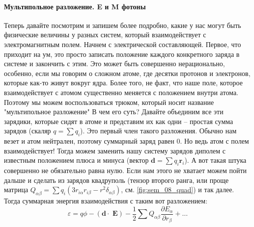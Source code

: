 \documentclass[12pt]{article}
\begin{document}
\paragraph{Мультипольное разложение. E и M фотоны}
Теперь давайте посмотрим и запишем более подробно, какие у нас могут быть физические величины у разных систем, который взаимодействует с электромагнитным полем. Начнем с электрической составляющей. Первое, что приходит на ум, это просто записать положение каждого конкретного заряда в системе и закончить с этим. Это может быть совершенно нерационально, особенно, если мы говорим о сложном атоме, где десятки протонов и электронов, которые как-то живут вокруг ядра. Более того, не факт, что наше поле, которое взаимодействует с атомом существенно меняется с положением внутри атома. Поэтому мы можем воспользоваться трюком, который носит название "мультипольное разложение" В чем его суть? Давайте объединим все эти зарядики, которые сидят в атоме и представим их как одни -- простая сумма зарядов (скаляр $q = \sum q_i$). Это первый член такого разложения. Обычно нам везет и атом нейтрален, поэтому суммарный заряд равен 0. Но ведь атом с полем взаимодействует! Тогда можем заменить нашу систему зарядов диполем с известным положением плюса и минуса (вектор $\textbf{d} = \sum q_i \textbf{r}_i$). А вот такая штука совершенно не обязательно равна нулю. Если нам этого не хватает можем пойти дальше и сделать из зарядов квадруполь (тензор второго ранга, или проще матрица $Q_{\alpha\beta} = \sum q_i(3r_{i\alpha}r_{i\beta}-r^2\delta_{\alpha\beta}) $, см. \ref{fig:sem_08_quad}) и так далее. Тогда суммарная энергия взаимодействия с таким вот разложением:
\begin{equation*}
    \varepsilon = q\phi - (\textbf{d}\cdot\textbf{ E}) - \dfrac{1}{2}\sum Q_{\alpha\beta}\dfrac{\partial E_{\alpha}}{\partial r_{\beta}}+ \dots
\end{equation*}
\end{document}
